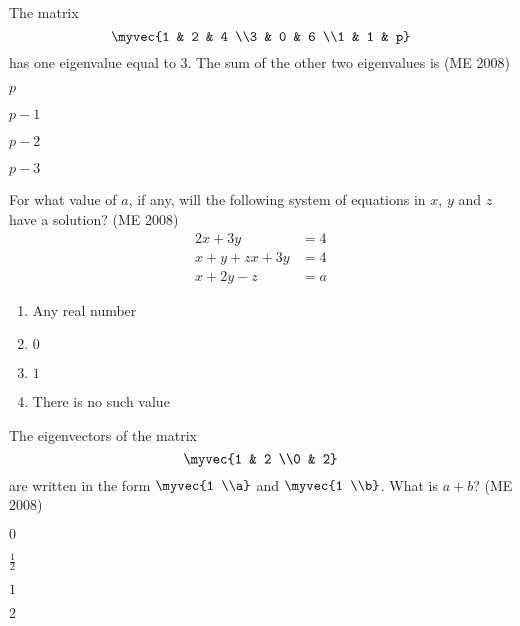     \item The matrix $$\myvec{1 & 2 & 4 \\3 & 0 & 6 \\1 & 1 & p}$$ has one eigenvalue equal to 3. The sum of the other two eigenvalues is
\hfill	    (ME 2008)
          \begin{enumerate}
              \begin{multicols}{4}
                  \item $p$
                  \item $p-1$
                  \item $p-2$
                  \item $p-3$
              \end{multicols}
          \end{enumerate}

    \item For what value of $a$, if any, will the following system of equations in $x$, $y$ and $z$ have a solution?
\hfill	    (ME 2008)
          \begin{align*}
		  2x+3y&=4 \\
              x+y+zx+3y&=4 \\
	      x+2y-z&=a
          \end{align*}
              \begin{multicols}{2}
          \begin{enumerate}
              \item Any real number
              \item $0$
              \item $1$
              \item There is no such value
          \end{enumerate}
  \end{multicols}
    \item The eigenvectors of the matrix $$\myvec{1 & 2 \\0 & 2}$$ are written in the form $\myvec{1 \\a}$ and $\myvec{1 \\b}$. What is $a+b$?
\hfill	    (ME 2008)
          \begin{enumerate}
              \begin{multicols}{4}
                  \item $0$
                  \item $\frac{1}{2}$
                  \item $1$
                  \item $2$
              \end{multicols}
          \end{enumerate}
